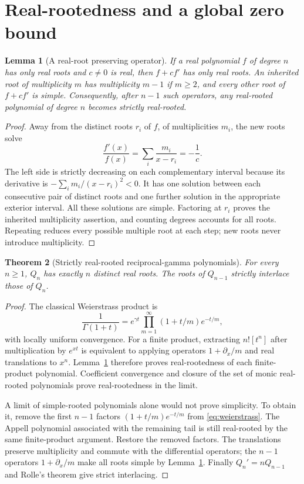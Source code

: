 \documentclass[11pt]{article}
\newtheorem{theorem}{Theorem}[section]
\newtheorem{lemma}[theorem]{Lemma}
\theoremstyle{definition}
\theoremstyle{remark}
\begin{document}
\section{Real-rootedness and a global zero bound}
\label{sec:zerobound}

\begin{lemma}[A real-root preserving operator]\label{lem:operator}
If a real polynomial $f$ of degree $n$ has only real roots and $c\neq0$ is real, then $f+cf'$ has only real roots. An inherited root of multiplicity $m$ has multiplicity $m-1$ if $m\geq2$, and every other root of $f+cf'$ is simple. Consequently, after $n-1$ such operators, any real-rooted polynomial of degree $n$ becomes strictly real-rooted.
\end{lemma}
\begin{proof}
Away from the distinct roots $r_i$ of $f$, of multiplicities $m_i$, the new roots solve
\[
 \frac{f'(x)}{f(x)}=\sum_i\frac{m_i}{x-r_i}=-\frac1c.
\]
The left side is strictly decreasing on each complementary interval because its derivative is $-\sum_i m_i/(x-r_i)^2<0$. It has one solution between each consecutive pair of distinct roots and one further solution in the appropriate exterior interval. All these solutions are simple. Factoring at $r_i$ proves the inherited multiplicity assertion, and counting degrees accounts for all roots. Repeating reduces every possible multiple root at each step; new roots never introduce multiplicity.
\end{proof}

\begin{theorem}[Strictly real-rooted reciprocal-gamma polynomials]\label{thm:Qroots}
For every $n\geq1$, $Q_n$ has exactly $n$ distinct real roots. The roots of $Q_{n-1}$ strictly interlace those of $Q_n$.
\end{theorem}
\begin{proof}
The classical Weierstrass product \cite{DLMFGamma} is
\begin{equation}\label{eq:weierstrass}
 \frac1{\Gamma(1+t)}=e^{\gamma t}
       \prod_{m=1}^\infty(1+t/m)e^{-t/m},
\end{equation}
with locally uniform convergence. For a finite product, extracting $n![t^n]$ after multiplication by $e^{xt}$ is equivalent to applying operators $1+\partial_x/m$ and real translations to $x^n$. Lemma~\ref{lem:operator} therefore proves real-rootedness of each finite-product polynomial. Coefficient convergence and closure of the set of monic real-rooted polynomials prove real-rootedness in the limit.

A limit of simple-rooted polynomials alone would not prove simplicity. To obtain it, remove the first $n-1$ factors $(1+t/m)e^{-t/m}$ from \eqref{eq:weierstrass}. The Appell polynomial associated with the remaining tail is still real-rooted by the same finite-product argument. Restore the removed factors. The translations preserve multiplicity and commute with the differential operators; the $n-1$ operators $1+\partial_x/m$ make all roots simple by Lemma~\ref{lem:operator}. Finally $Q_n'=nQ_{n-1}$ and Rolle's theorem give strict interlacing.
\end{proof}
\end{document}
